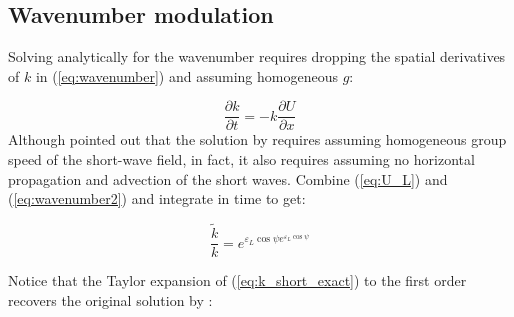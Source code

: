 \documentclass[lineno]{jfm}
\begin{document}
\subsection{Wavenumber modulation}
\label{subsection:wavenumber_modulation}

Solving analytically for the wavenumber requires dropping the spatial derivatives
of $k$ in (\ref{eq:wavenumber}) and assuming homogeneous $g$:

\begin{equation}
\label{eq:wavenumber2}
\dfrac{\partial k}{\partial t}
= - k \dfrac{\partial U}{\partial x}
\end{equation}
Although \citet{peureux2021unsteady} pointed out that the solution by
\citet{longuet1960changes} requires assuming homogeneous group speed of the
short-wave field, in fact, it also requires assuming no horizontal propagation
and advection of the short waves.
Combine (\ref{eq:U_L}) and (\ref{eq:wavenumber2}) and integrate in time to get:

\begin{equation}
\label{eq:k_short_exact}
\frac{\widetilde{k}}{k} = e^{\varepsilon_L \cos{\psi} e^{\varepsilon_L \cos{\psi}}}
\end{equation}

Notice that the Taylor expansion of (\ref{eq:k_short_exact}) to the first order
recovers the original solution by \citet{longuet1960changes}:
\end{document}
